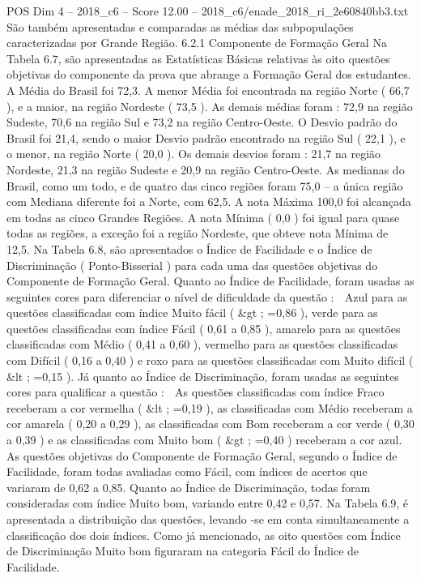\begin{textsample}{POS Dim 4 – 2018\_c6 – Score 12.00 – 2018\_c6/enade\_2018\_ri\_2e60840bb3.txt}
São também apresentadas e comparadas as médias das subpopulações caracterizadas por Grande Região. 6.2.1 Componente de Formação Geral Na Tabela 6.7, são apresentadas as Estatísticas Básicas relativas às oito questões objetivas do componente da prova que abrange a Formação Geral dos estudantes.
A Média do Brasil foi 72,3.
A menor Média foi encontrada na região Norte ( 66,7 ), e a maior, na região Nordeste ( 73,5 ).
As demais médias foram : 72,9 na região Sudeste, 70,6 na região Sul e 73,2 na região Centro-Oeste.
O Desvio padrão do Brasil foi 21,4, sendo o maior Desvio padrão encontrado na região Sul ( 22,1 ), e o menor, na região Norte ( 20,0 ).
Os demais desvios foram : 21,7 na região Nordeste, 21,3 na região Sudeste e 20,9 na região Centro-Oeste.
As medianas do Brasil, como um todo, e de quatro das cinco regiões foram 75,0 – a única região com Mediana diferente foi a Norte, com 62,5.
A nota Máxima 100,0 foi alcançada em todas as cinco Grandes Regiões.
A nota Mínima ( 0,0 ) foi igual para quase todas as regiões, a exceção foi a região Nordeste, que obteve nota Mínima de 12,5.
Na Tabela 6.8, são apresentados o Índice de Facilidade e o Índice de Discriminação ( Ponto-Bisserial ) para cada uma das questões objetivas do Componente de Formação Geral.
Quanto ao Índice de Facilidade, foram usadas as seguintes cores para diferenciar o nível de dificuldade da questão :  Azul para as questões classificadas com índice Muito fácil ( \&gt ; =0,86 ), verde para as questões classificadas com índice Fácil ( 0,61 a 0,85 ), amarelo para as questões classificadas com Médio ( 0,41 a 0,60 ), vermelho para as questões classificadas com Difícil ( 0,16 a 0,40 ) e roxo para as questões classificadas com Muito difícil ( \&lt ; =0,15 ).
Já quanto ao Índice de Discriminação, foram usadas as seguintes cores para qualificar a questão :  As questões classificadas com índice Fraco receberam a cor vermelha ( \&lt ; =0,19 ), as classificadas com Médio receberam a cor amarela ( 0,20 a 0,29 ), as classificadas com Bom receberam a cor verde ( 0,30 a 0,39 ) e as classificadas com Muito bom ( \&gt ; =0,40 ) receberam a cor azul.
As questões objetivas do Componente de Formação Geral, segundo o Índice de Facilidade, foram todas avaliadas como Fácil, com índices de acertos que variaram de 0,62 a 0,85.
Quanto ao Índice de Discriminação, todas foram consideradas com índice Muito bom, variando entre 0,42 e 0,57.
Na Tabela 6.9, é apresentada a distribuição das questões, levando -se em conta simultaneamente a classificação dos dois índices.
Como já mencionado, as oito questões com Índice de Discriminação Muito bom figuraram na categoria Fácil do Índice de Facilidade.

\end{textsample}
